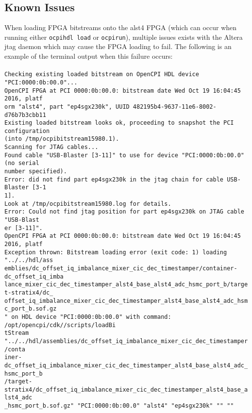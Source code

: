 \documentclass{article}
\newcommand{\terminaloutput}[1]{\texttt{#1}}
\begin{document}
\subsection*{Known Issues}
When loading FPGA bitstreams onto the alst4 FPGA (which can occur when running either \terminaloutput{ocpihdl load} or \terminaloutput{ocpirun}), multiple issues exists with the Altera jtag daemon which may cause the FPGA loading to fail. The following is an example of the terminal output when this failure occurs: \\ \\
\noindent\terminaloutput{Checking existing loaded bitstream on OpenCPI HDL device "PCI:0000:0b:00.0"... \\
OpenCPI FPGA at PCI 0000:0b:00.0: bitstream date Wed Oct 19 16:04:45 2016, platf \\
orm "alst4", part "ep4sgx230k", UUID 482195b4-9637-11e6-8002-d76b7b3cbb11 \\
Existing loaded bitstream looks ok, proceeding to snapshot the PCI configuration \\
 (into /tmp/ocpibitstream15980.1). \\
Scanning for JTAG cables... \\
Found cable "USB-Blaster [3-11]" to use for device "PCI:0000:0b:00.0" (no serial \\
number specified). \\
Error: did not find part ep4sgx230k in the jtag chain for cable USB-Blaster [3-1 \\
1]. \\
Look at /tmp/ocpibitstream15980.log for details. \\
Error: Could not find jtag position for part ep4sgx230k on JTAG cable "USB-Blast \\
er [3-11]". \\
OpenCPI FPGA at PCI 0000:0b:00.0: bitstream date Wed Oct 19 16:04:45 2016, platf \\
Exception thrown: Bitstream loading error (exit code: 1) loading "../../hdl/ass \\
emblies/dc\_offset\_iq\_imbalance\_mixer\_cic\_dec\_timestamper/container-dc\_offset\_iq\_imba \\
lance\_mixer\_cic\_dec\_timestamper\_alst4\_base\_alst4\_adc\_hsmc\_port\_b/target-stratix4/dc\_ \\
offset\_iq\_imbalance\_mixer\_cic\_dec\_timestamper\_alst4\_base\_alst4\_adc\_hsmc\_port\_b.sof.gz \\
" on HDL device "PCI:0000:0b:00.0" with command: /opt/opencpi/cdk//scripts/loadBi \\
tStream "../../hdl/assemblies/dc\_offset\_iq\_imbalance\_mixer\_cic\_dec\_timestamper/conta \\iner-dc\_offset\_iq\_imbalance\_mixer\_cic\_dec\_timestamper\_alst4\_base\_alst4\_adc\_hsmc\_port\_b \\
/target-stratix4/dc\_offset\_iq\_imbalance\_mixer\_cic\_dec\_timestamper\_alst4\_base\_alst4\_adc \\
\_hsmc\_port\_b.sof.gz" "PCI:0000:0b:00.0" "alst4" "ep4sgx230k" "" "" \\
\\
}
\end{document}
